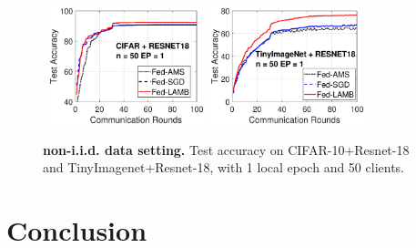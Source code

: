 \documentclass[11pt]{article}
\begin{document}
\begin{figure}[t]
    \begin{center}
        \mbox{
        \hspace{-0.05in}\includegraphics[width=0.4\textwidth]{new_figure/cifar_testerror_resnet18_ep1_client2_iid0.eps}
        \hspace{-0.1in}\includegraphics[width=0.4\textwidth]{new_figure/tinyimagenet_testerror_resnet18_ep1_client2_iid0.eps}
        }
    \end{center}
    \vspace{0.15in}
	\caption{\textbf{non-i.i.d. data setting.} Test accuracy on CIFAR-10+Resnet-18 and TinyImagenet+Resnet-18, with 1 local epoch and 50 clients.
	}
	\label{fig:noniidresnet18}
\end{figure}



\section{Conclusion}\label{sec:conclusion}
\end{document}
